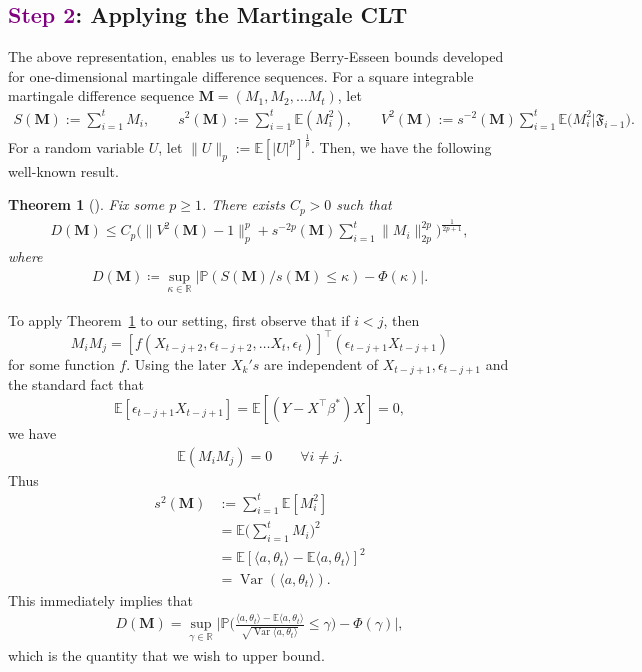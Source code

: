 \documentclass[11pt, reqno,english]{amsart}
\DeclareMathOperator{\Var}{Var} \DeclareMathOperator{\N}{N}
\newtheorem{theorem}{Theorem}[section]
\begin{document}
\subsection*{\textcolor{purple}{Step 2}: Applying the Martingale CLT}
The above representation, enables us to leverage Berry-Esseen bounds developed for one-dimensional martingale difference sequences. For a square integrable martingale difference sequence $\mathbf{M} = (M_1, M_2,\dots M_t)$, let
\begin{align*}
  S(\mathbf{M}) := \sum_{i = 1}^{t}M_i,   \qquad  s^2(\mathbf{M}) := \sum_{i = 1}^{t}\mathbb{E}(M_i^2), \qquad
    V^2(\mathbf{M}) := s^{-2}(\mathbf{M})\sum_{i = 1}^{t}\mathbb{E}\big(M_i^2|\mathfrak{F}_{i-1}\big).
\end{align*}
For a random variable $U$, let $\|U\|_p := \mathbb{E}[|U|^p]^{\frac{1}{p}}$. Then, we have the following well-known result. 
\begin{theorem}[\cite{haeusler1988rate}]\label{ppn:Mourrat} 
Fix some $p \geq 1$. There exists $C_p > 0$ such that \\
\begin{align}\label{eq:rhsmartingale}
    D(\mathbf{M}) \leq C_p\bigg(\|V^2(\mathbf{M}) - 1\|_p^p + s^{-2p}(\mathbf{M})\sum_{i = 1}^{t}\|M_i\|_{2p}^{2p}\bigg)^{\frac{1}{2p+1}},
\end{align}
where
\begin{align*}
    D(\mathbf{M})\coloneqq \sup_{\kappa \in \mathbb{R}}|\mathbb{P}(S(\mathbf{M})/s(\mathbf{M}) \leq \kappa) - \Phi(\kappa)|.
\end{align*}
\end{theorem}
\noindent To apply Theorem~\ref{ppn:Mourrat} to our setting, first observe that
if $i < j$, then $$M_i M_j = [f(X_{t-j+2}, \epsilon_{t-j+2}, \dots X_t, \epsilon_t)]^\top(\epsilon_{t-j+1}X_{t-j+1})$$ for some function $f$. Using the later $X_k's$ are independent of $X_{t-j+1}, \epsilon_{t-j+1}$ and the standard fact that $$\mathbb{E}[\epsilon_{t-j+1}X_{t-j+1}] = \mathbb{E}[(Y-X^\top \beta^*)X] = 0, $$we have
\begin{align*}
   \mathbb{E}(M_iM_j) = 0 \qquad \forall i \not =  j.
\end{align*}
Thus
\begin{align*}
    s^2(\mathbf{M}) &:= \sum_{i = 1}^t\mathbb{E}[M^2_i]
    \\
    &=\mathbb{E}\bigg(\sum_{i = 1}^tM_i\bigg)^2 
    \\
    &= \mathbb{E}[\langle a, \theta_t\rangle - \mathbb{E}\langle a, \theta_t \rangle]^2
    \\
    &= \Var(\langle a, \theta_t \rangle).
\end{align*}
This immediately implies that
\begin{align*}
    D(\textbf{M}) = \sup_{\gamma \in \mathbb{R}}\bigg|\mathbb{P}\bigg(\frac{\langle a, \theta_t \rangle - \mathbb{E}\langle a, \theta_t \rangle}{\sqrt{\Var\langle a, \theta_t \rangle}}\leq \gamma\bigg) - \Phi(\gamma)\bigg|,
\end{align*}
which is the quantity that we wish to upper bound. 
\end{document}

